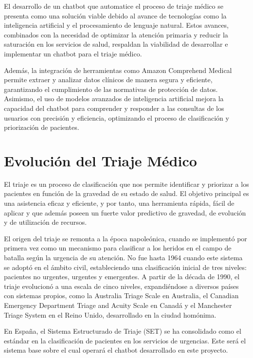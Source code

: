 
El desarrollo de un chatbot que automatice el proceso de triaje médico se presenta como una solución viable debido al avance de tecnologías como la inteligencia artificial y el procesamiento de lenguaje natural. Estos avances, combinados con la necesidad de optimizar la atención primaria y reducir la saturación en los servicios de salud, respaldan la viabilidad de desarrollar e implementar un chatbot para el triaje médico.

Además, la integración de herramientas como Amazon Comprehend Medical permite extraer y analizar datos clínicos de manera segura y eficiente, garantizando el cumplimiento de las normativas de protección de datos. Asimismo, el uso de modelos avanzados de inteligencia artificial mejora la capacidad del chatbot para comprender y responder a las consultas de los usuarios con precisión y eficiencia, optimizando el proceso de clasificación y priorización de pacientes.

\section{Evolución del Triaje Médico}

El triaje es un proceso de clasificación que nos permite identificar y priorizar a los pacientes en función de la gravedad de su estado de salud. El objetivo principal es una asistencia eficaz y eficiente, y por tanto, una herramienta rápida, fácil de aplicar y que además poseen un fuerte valor predictivo de gravedad, de evolución y de utilización de recursos. \cite{SOLER2010}

El origen del triaje se remonta a la época napoleónica, cuando se implementó por primera vez como un mecanismo para clasificar a los heridos en el campo de batalla según la urgencia de su atención. No fue hasta 1964 cuando este sistema se adoptó en el ámbito civil, estableciendo una clasificación inicial de tres niveles: pacientes no urgentes, urgentes y emergentes. A partir de la década de 1990, el triaje evolucionó a una escala de cinco niveles, expandiéndose a diversos países con sistemas propios, como la Australia Triage Scale en Australia, el Canadian Emergency Department Triage and Acuity Scale en Canadá y el Manchester Triage System en el Reino Unido, desarrollado en la ciudad homónima.

En España, el Sistema Estructurado de Triaje (SET) se ha consolidado como el estándar en la clasificación de pacientes en los servicios de urgencias. Este será el sistema base sobre el cual operará el chatbot desarrollado en este proyecto. \cite{eswiki_triaje}

